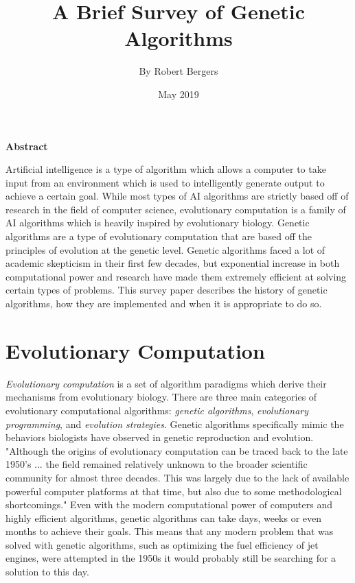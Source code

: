 \documentclass[a4paper]{article}
\title{\Large{\textbf{A Brief Survey of Genetic Algorithms}}}
\author{By Robert Bergers}
\date{May 2019}
\begin{document}
\maketitle

\begin{center}
    \Large{\textbf{Abstract}}
\end{center}
Artificial intelligence is a type of algorithm which allows a computer to take input from an environment which is used to intelligently generate output to achieve a certain goal. While most types of AI algorithms are strictly based off of research in the field of computer science, evolutionary computation is a family of AI algorithms which is heavily inspired by evolutionary biology. Genetic algorithms are a type of evolutionary computation that are based off the principles of evolution at the genetic level. Genetic algorithms faced a lot of academic skepticism in their first few decades, but exponential increase in both computational power and research have made them extremely efficient at solving certain types of problems. This survey paper describes the history of genetic algorithms, how they are implemented and when it is appropriate to do so.

\section{Evolutionary Computation}
\textit{Evolutionary computation} is a set of algorithm paradigms which derive their mechanisms from evolutionary biology. There are three main categories of evolutionary computational algorithms: \textit{genetic algorithms}, \textit{evolutionary programming}, and \textit{evolution strategies}. Genetic algorithms specifically mimic the behaviors biologists have observed in genetic reproduction and evolution.\\

"Although the origins of evolutionary computation can be
traced back to the late 1950’s ... the field remained relatively unknown to the broader scientific community for almost three decades. This was largely due to the lack of available powerful computer platforms at that time, but also due to some methodological shortcomings."\cite{echistory} Even with the modern computational power of computers and highly efficient algorithms, genetic algorithms can take days, weeks or even months to achieve their goals. This means that any modern problem that was solved with genetic algorithms, such as optimizing the fuel efficiency of jet engines, were attempted in the 1950s it would probably still be searching for a solution to this day.\\
\end{document}
